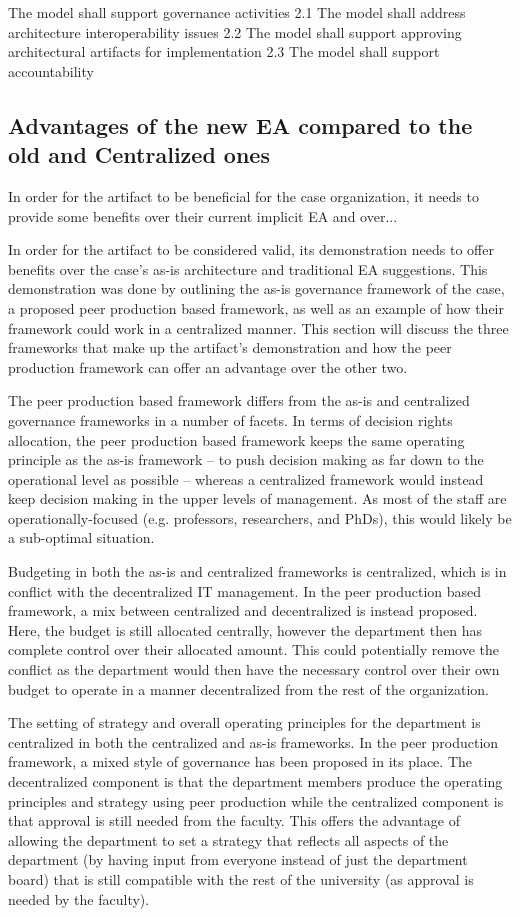 The model shall support governance activities
2.1 The model shall address architecture interoperability issues
2.2 The model shall support approving architectural artifacts for implementation
2.3 The model shall support accountability


\subsection{Advantages of the new EA compared to the old and Centralized ones}

In order for the artifact to be beneficial for the case organization, it needs to provide some benefits over their current implicit EA and over... 

In order for the artifact to be considered valid, its demonstration needs to offer benefits over the case's as-is architecture and traditional EA suggestions. This demonstration was done by outlining the as-is governance framework of the case, a proposed peer production based framework, as well as an example of how their framework could work in a centralized manner. This section will discuss the three frameworks that make up the artifact's demonstration and how the peer production framework can offer an advantage over the other two. 


The peer production based framework differs from the as-is and centralized governance frameworks in a number of facets. In terms of decision rights allocation, the peer production based framework keeps the same operating principle as the as-is framework -- to push decision making as far down to the operational level as possible -- whereas a centralized framework would instead keep decision making in the upper levels of management. As most of the staff are operationally-focused (e.g. professors, researchers, and PhDs), this would likely be a sub-optimal situation. 

Budgeting in both the as-is and centralized frameworks is centralized, which is in conflict with the decentralized IT management. In the peer production based framework, a mix between  centralized and decentralized is instead proposed. Here, the budget is still allocated centrally, however the department then has complete control over their allocated amount. This could potentially remove the conflict as the department would then have the necessary control over their own budget to operate in a manner decentralized from the rest of the organization. 

The setting of strategy and overall operating principles for the department is centralized in both the centralized and as-is frameworks. In the peer production framework, a mixed style of governance has been proposed in its place. The decentralized component is that the department members produce the operating principles and strategy using peer production while the centralized component is that approval is still needed from the faculty. This offers the advantage of allowing the department to set a strategy that reflects all aspects of the department (by having input from everyone instead of just the department board) that is still compatible with the rest of the university (as approval is needed by the faculty).

